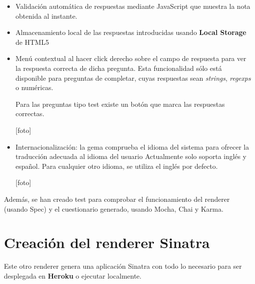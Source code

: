 \begin{itemize}
\begin{itemize}
\begin{itemize}
      [foto]
    \end{itemize}
  \end{itemize}
  
  \item Validaci\'on autom\'atica de respuestas mediante JavaScript que muestra la nota obtenida al instante.
  \item Almacenamiento local de las respuestas introducidas usando {\bfseries Local Storage} de HTML5
  \item Men\'u contextual al hacer click derecho sobre el campo de respuesta para ver la respuesta correcta de dicha pregunta.
  Esta funcionalidad s\'olo est\'a disponible para preguntas de completar, cuyas respuestas sean \textit{strings},
  \textit{regexps} o num\'ericas.
  
  \bigskip
  [foto]
  \bigskip
  
  Para las preguntas tipo test existe un bot\'on que marca las respuestas correctas.
  
  [foto]
  
  \item Internacionalizaci\'on: la gema comprueba el idioma del sistema para ofrecer la traducci\'on adecuada al idioma del usuario
  Actualmente solo soporta ingl\'es y espa\~{n}ol. Para cualquier otro idioma, se utiliza el ingl\'es por defecto.
  
  [foto]

\end{itemize}

Adem\'as, se han creado test para comprobar el funcionamiento del renderer (usando Spec) y el cuestionario generado, usando Mocha, Chai y Karma.

\section{Creaci\'on del renderer Sinatra}
\label{:sec3}

Este otro renderer genera una aplicaci\'on Sinatra con todo lo necesario para ser desplegada en {\bfseries Heroku} o ejecutar localmente. 
\bigskip

